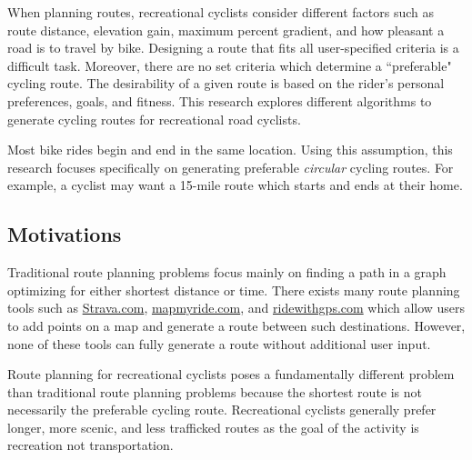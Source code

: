\documentclass[honors]{union-cs-thesis}
\newcommand{\td}{\todo[inline]}
\begin{document}
When planning routes, recreational cyclists consider different factors such as route distance, elevation gain, maximum percent gradient, and how pleasant a road is to travel by bike. Designing a route that fits all user-specified criteria is a difficult task.  Moreover, there are no set criteria which determine a ``preferable" cycling route. The desirability of a given route is based on the rider's personal preferences, goals, and fitness. This research explores different algorithms to generate cycling routes for recreational road cyclists.


Most bike rides begin and end in the same location. Using this assumption, this research focuses specifically on generating preferable \emph{circular} cycling routes. For example, a cyclist may want a 15-mile route which starts and ends at their home.
    

\subsection{Motivations}
Traditional route planning problems focus mainly on finding a path in a graph optimizing for either shortest distance or time. There exists many route planning tools such as \href{https://www.strava.com/routes/new}{Strava.com}, \href{https://www.mapmyride.com}{mapmyride.com}, and \href{https://ridewithgps.com}{ridewithgps.com} which allow users to add points on a map and generate a route between such destinations. However, none of these tools can fully generate a route without additional user input.

Route planning for recreational cyclists poses a fundamentally different problem than traditional route planning problems because the shortest route is not necessarily the 	preferable cycling route. Recreational cyclists generally prefer longer, more scenic, and less trafficked routes as the goal of the activity is recreation not transportation. 

\end{document}
